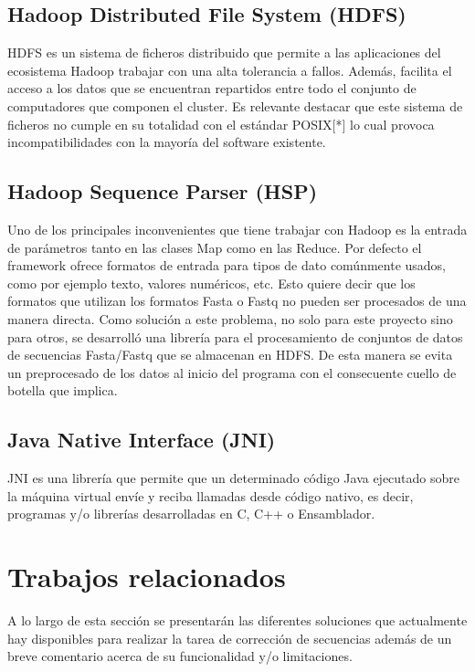 \documentclass[conference]{IEEEtran}
\begin{document}
\subsection{Hadoop Distributed File System (HDFS)}
HDFS\cite{hadoop_hdfs} es un sistema de ficheros distribuido que permite a las aplicaciones del ecosistema Hadoop trabajar con una alta tolerancia a fallos. Además, facilita el acceso a los datos que se encuentran repartidos entre todo el conjunto de computadores que componen el cluster. Es relevante destacar que este sistema de ficheros no cumple en su totalidad con el estándar POSIX[*] lo cual provoca incompatibilidades con la mayoría del software existente.

\subsection{Hadoop Sequence Parser (HSP)\cite{hsp}}
Uno de los principales inconvenientes que tiene trabajar con Hadoop es la entrada de parámetros tanto en las clases Map como en las Reduce. Por defecto el framework ofrece formatos de entrada para tipos de dato comúnmente usados, como por ejemplo texto, valores numéricos, etc. Esto quiere decir que los formatos que utilizan los formatos Fasta o Fastq\cite{fastq} no pueden ser procesados de una manera directa. Como solución a este problema, no solo para este proyecto sino para otros, se desarrolló una librería para el procesamiento de conjuntos de datos de secuencias Fasta/Fastq que se almacenan en HDFS. De esta manera se evita un preprocesado de los datos al inicio del programa con el consecuente cuello de botella que implica.

\subsection{Java Native Interface (JNI)}
JNI\cite{jni} es una librería que permite que un determinado código Java ejecutado sobre la máquina virtual envíe y reciba llamadas desde código nativo, es decir, programas y/o librerías desarrolladas en C, C++ o Ensamblador.

\section{Trabajos relacionados}

A lo largo de esta sección se presentarán las diferentes soluciones que actualmente hay disponibles para realizar la tarea de corrección de secuencias además de un breve comentario acerca de su funcionalidad y/o limitaciones.
\end{document}

